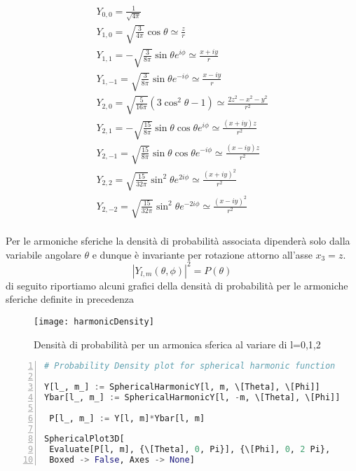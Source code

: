 \begin{equation*}
	\begin{array}{l}
		Y_{0,0} = \frac{1}{\sqrt{4 \pi}} \\[0.5cm]
		Y_{1,0} = \sqrt{\frac{3}{4 \pi}}\cos\theta \simeq \frac{z}{r}\\[0.5cm]
		Y_{1,1} = - \sqrt{\frac{3}{8\pi}}\sin \theta e^{i\phi} \simeq \frac{x+iy}{r}\\[0.5cm]
		Y_{1,-1} = \sqrt{\frac{3}{8\pi}}\sin \theta e^{-i\phi} \simeq \frac{x-iy}{r}\\[0.5cm]
		Y_{2,0} = \sqrt{\frac{5}{16 \pi}}(3\cos^2\theta -1) \simeq \frac{2z^2-x^2-y^2}{r^2} \\[0.5cm]
		Y_{2,1} = - \sqrt{\frac{15}{8\pi}}\sin\theta \cos\theta e^{i\phi} \simeq \frac{(x+iy)z}{r^2} \\[0.5cm]
		Y_{2,-1} =  \sqrt{\frac{15}{8\pi}}\sin\theta \cos\theta e^{-i\phi} \simeq \frac{(x-iy)z}{r^2}\\[0.5cm]
		Y_{2,2} = \sqrt{\frac{15}{32 \pi}}\sin^2\theta e^{2i\phi} \simeq \frac{(x+iy)^2}{r^2}\\[0.5cm]
		Y_{2,-2} = \sqrt{\frac{15}{32 \pi}}\sin^2\theta e^{-2i\phi} \simeq \frac{(x-iy)^2}{r^2}\\[0.5cm] 
	\end{array}
\end{equation*}

\newpage 

Per le armoniche sferiche la densit\`a di probabilit\`a associata dipender\`a solo dalla variabile angolare $\theta$ e dunque \`e invariante per rotazione attorno all'asse $x_3 = z $.
\begin{equation*}
	|Y_{l,m}(\theta,\phi)|^2 = P(\theta) 
\end{equation*}
di seguito riportiamo alcuni grafici della densit\`a di probabilit\`a per le armoniche sferiche definite in precedenza 
 
\begin{figure}[!ht]
\vspace{0.1in}
\texttt{[image: harmonicDensity]}	
\centering
\vspace{0.1in}
\caption{Densit\`a di probabilit\`a per un armonica sferica al variare di l=0,1,2}
\end{figure}
\begin{lstlisting}[language=Python, caption= Mathematica Snippet, numbers=left, frame=single]
# Probability Density plot for spherical harmonic function

Y[l_, m_] := SphericalHarmonicY[l, m, \[Theta], \[Phi]]
Ybar[l_, m_] := SphericalHarmonicY[l, -m, \[Theta], \[Phi]] 

 P[l_, m_] := Y[l, m]*Ybar[l, m]
 
SphericalPlot3D[
 Evaluate[P[l, m], {\[Theta], 0, Pi}], {\[Phi], 0, 2 Pi}, 
 Boxed -> False, Axes -> None]
\end{lstlisting}

